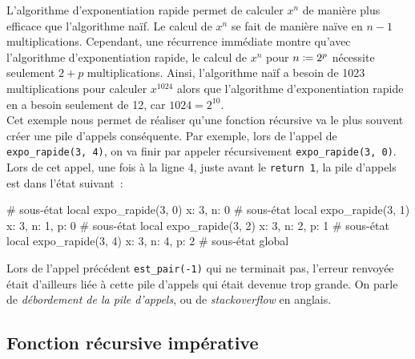 \documentclass{magnolia}
\begin{document}
\noindent
L'algorithme d'exponentiation rapide permet de calculer $x^n$ de manière plus efficace
que l'algorithme naïf. Le calcul de $x^n$ se fait de manière naïve en $n-1$ multiplications.
Cependant, une récurrence immédiate montre qu'avec l'algorithme d'exponentiation rapide,
le calcul de $x^n$ pour $n\coloneqq 2^p$ nécessite seulement $2+p$ multiplications.
Ainsi, l'algorithme naïf a besoin de 1023 multiplications pour calculer $x^{1024}$ alors
que l'algorithme d'exponentiation rapide en a besoin seulement de 12, car $1024=2^{10}$.\\

Cet exemple nous permet de réaliser qu'une fonction récursive va le plus souvent
créer une pile d'appels conséquente. Par exemple, lors de l'appel
de \verb!expo_rapide(3, 4)!, on va finir par appeler récursivement
\verb!expo_rapide(3, 0)!. Lors de cet appel, une fois à la ligne 4, juste avant
le \verb!return 1!, la pile d'appels est dans l'état suivant~:

\begin{pythoncode}
# sous-état local expo_rapide(3, 0)  {x: 3, n: 0}
# sous-état local expo_rapide(3, 1)  {x: 3, n: 1, p: 0}
# sous-état local expo_rapide(3, 2)  {x: 3, n: 2, p: 1}
# sous-état local expo_rapide(3, 4)  {x: 3, n: 4, p: 2}
# sous-état global                   {}
\end{pythoncode}
\noindent Lors de l'appel précédent \verb!est_pair(-1)! qui ne terminait pas, l'erreur renvoyée était d'ailleurs
liée à cette pile d'appels qui était devenue trop grande. On parle de \emph{débordement
de la pile d'appels}, ou de \emph{stackoverflow} en anglais.


\subsection{Fonction récursive impérative}
\end{document}

